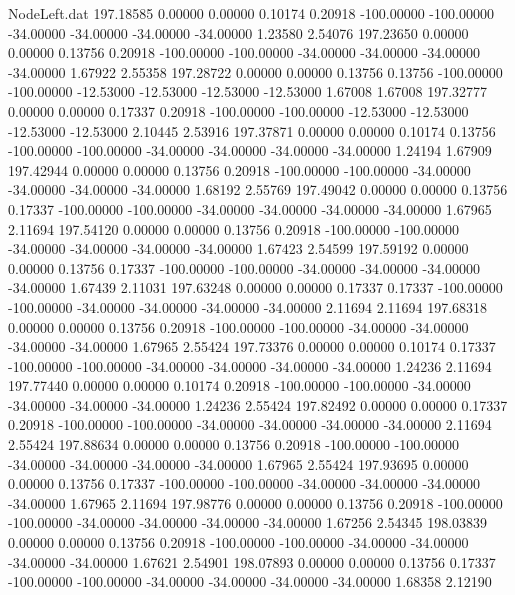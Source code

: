 \begin{filecontents}{NodeLeft.dat}
 197.18585    0.00000    0.00000     0.10174    0.20918 -100.00000 -100.00000  -34.00000  -34.00000  -34.00000  -34.00000    1.23580    2.54076
 197.23650    0.00000    0.00000     0.13756    0.20918 -100.00000 -100.00000  -34.00000  -34.00000  -34.00000  -34.00000    1.67922    2.55358
 197.28722    0.00000    0.00000     0.13756    0.13756 -100.00000 -100.00000  -12.53000  -12.53000  -12.53000  -12.53000    1.67008    1.67008
 197.32777    0.00000    0.00000     0.17337    0.20918 -100.00000 -100.00000  -12.53000  -12.53000  -12.53000  -12.53000    2.10445    2.53916
 197.37871    0.00000    0.00000     0.10174    0.13756 -100.00000 -100.00000  -34.00000  -34.00000  -34.00000  -34.00000    1.24194    1.67909
 197.42944    0.00000    0.00000     0.13756    0.20918 -100.00000 -100.00000  -34.00000  -34.00000  -34.00000  -34.00000    1.68192    2.55769
 197.49042    0.00000    0.00000     0.13756    0.17337 -100.00000 -100.00000  -34.00000  -34.00000  -34.00000  -34.00000    1.67965    2.11694
 197.54120    0.00000    0.00000     0.13756    0.20918 -100.00000 -100.00000  -34.00000  -34.00000  -34.00000  -34.00000    1.67423    2.54599
 197.59192    0.00000    0.00000     0.13756    0.17337 -100.00000 -100.00000  -34.00000  -34.00000  -34.00000  -34.00000    1.67439    2.11031
 197.63248    0.00000    0.00000     0.17337    0.17337 -100.00000 -100.00000  -34.00000  -34.00000  -34.00000  -34.00000    2.11694    2.11694
 197.68318    0.00000    0.00000     0.13756    0.20918 -100.00000 -100.00000  -34.00000  -34.00000  -34.00000  -34.00000    1.67965    2.55424
 197.73376    0.00000    0.00000     0.10174    0.17337 -100.00000 -100.00000  -34.00000  -34.00000  -34.00000  -34.00000    1.24236    2.11694
 197.77440    0.00000    0.00000     0.10174    0.20918 -100.00000 -100.00000  -34.00000  -34.00000  -34.00000  -34.00000    1.24236    2.55424
 197.82492    0.00000    0.00000     0.17337    0.20918 -100.00000 -100.00000  -34.00000  -34.00000  -34.00000  -34.00000    2.11694    2.55424
 197.88634    0.00000    0.00000     0.13756    0.20918 -100.00000 -100.00000  -34.00000  -34.00000  -34.00000  -34.00000    1.67965    2.55424
 197.93695    0.00000    0.00000     0.13756    0.17337 -100.00000 -100.00000  -34.00000  -34.00000  -34.00000  -34.00000    1.67965    2.11694
 197.98776    0.00000    0.00000     0.13756    0.20918 -100.00000 -100.00000  -34.00000  -34.00000  -34.00000  -34.00000    1.67256    2.54345
 198.03839    0.00000    0.00000     0.13756    0.20918 -100.00000 -100.00000  -34.00000  -34.00000  -34.00000  -34.00000    1.67621    2.54901
 198.07893    0.00000    0.00000     0.13756    0.17337 -100.00000 -100.00000  -34.00000  -34.00000  -34.00000  -34.00000    1.68358    2.12190

\end{filecontents}
